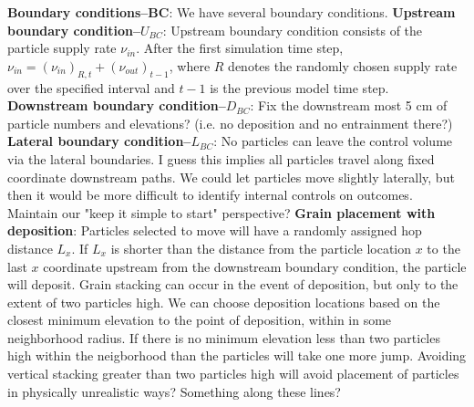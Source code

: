 \documentclass[12pt]{article}
\begin{document}
\begin{outline}[enumerate]
%
\1 \textbf{Boundary conditions--BC}: We have several boundary conditions.
	\2 \textbf{Upstream boundary condition--$U_{BC}$}: Upstream boundary condition consists of the particle supply rate $\nu_{in}$. After the first simulation time step, $\nu_{in}=(\nu_{in})_{R,t}+(\nu_{out})_{t-1}$, where $R$ denotes the randomly chosen supply rate over the specified interval and $t-1$ is the previous model time step.
	\2 \textbf{Downstream boundary condition--$D_{BC}$}: Fix the downstream most 5 cm of particle numbers and elevations? (i.e. no deposition and no entrainment there?)
	\2 \textbf{Lateral boundary condition--$L_{BC}$}: No particles can leave the control volume via the lateral boundaries. I guess this implies all particles travel along fixed coordinate downstream paths. We could let particles move slightly laterally, but then it would be more difficult to identify internal controls on outcomes. Maintain our "keep it simple to start" perspective?
\1 \textbf{Grain placement with deposition}: Particles selected to move will have a randomly assigned hop distance $L_x$. If $L_x$ is shorter than the distance from the particle location $x$ to the last $x$ coordinate upstream from the downstream boundary condition, the particle will deposit. Grain stacking can occur in the event of deposition, but only to the extent of two particles high. We can choose deposition locations based on the closest minimum elevation to the point of deposition, within in some neighborhood radius. If there is no minimum elevation less than two particles high within the neigborhood than the particles will take one more jump. Avoiding vertical stacking greater than two particles high will avoid placement of particles in physically unrealistic ways? Something along these lines?
\end{outline}
\end{document}
